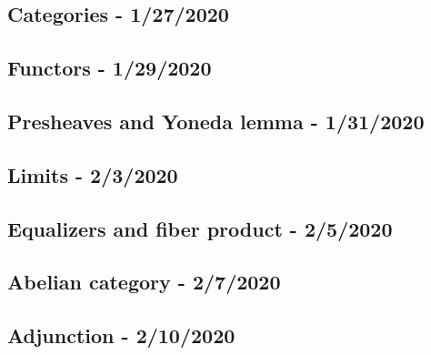 \documentclass[../main.tex]{subfiles}
\begin{document}
\subsection{Categories - 1/27/2020}

\newpage

\subsection{Functors - 1/29/2020}

\newpage

\subsection{Presheaves and Yoneda lemma - 1/31/2020}

\newpage

\subsection{Limits - 2/3/2020}

\newpage

\subsection{Equalizers and fiber product - 2/5/2020}

\newpage

\subsection{Abelian category - 2/7/2020}

\newpage

\subsection{Adjunction - 2/10/2020}

\newpage
\end{document}
